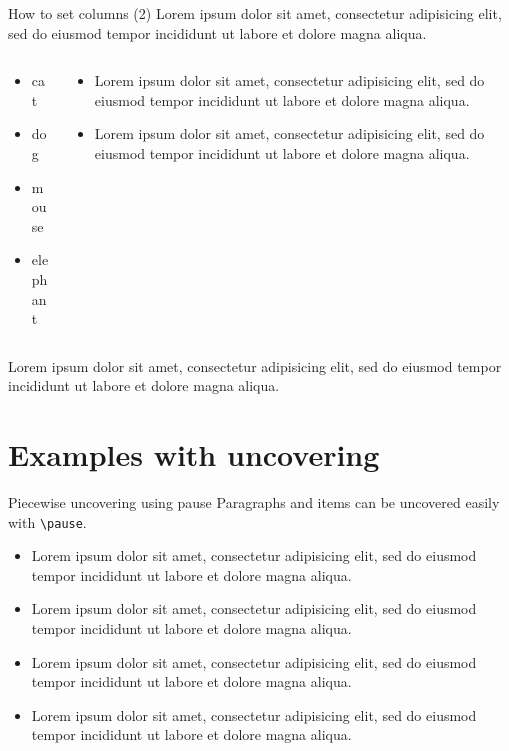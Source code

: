 \documentclass[]{beamer}
\begin{document}
\begin{frame}{How to set columns (2)}
  Lorem ipsum dolor sit amet, consectetur adipisicing elit, sed do eiusmod tempor incididunt ut labore et dolore magna aliqua. 
  \begin{columns}[t]
    \begin{column}{.4\textwidth}
      \begin{itemize}
        \item cat
        \item dog
        \item mouse
        \item elephant
      \end{itemize}
    \end{column}
    \begin{column}{.6\textwidth}
      \begin{itemize}
        \item Lorem ipsum dolor sit amet, consectetur adipisicing elit, sed do eiusmod tempor incididunt ut labore et dolore magna aliqua. 
        \item Lorem ipsum dolor sit amet, consectetur adipisicing elit, sed do eiusmod tempor incididunt ut labore et dolore magna aliqua. 
      \end{itemize}
    \end{column}
  \end{columns}

  Lorem ipsum dolor sit amet, consectetur adipisicing elit, sed do eiusmod tempor incididunt ut labore et dolore magna aliqua. 
\end{frame}

%

\section{Examples with uncovering}

\begin{frame}{Piecewise uncovering using pause}
  Paragraphs and items can be uncovered easily with \texttt{\textbackslash pause}.
  \pause
  \begin{itemize}
    \item Lorem ipsum dolor sit amet, consectetur adipisicing elit, sed do eiusmod tempor incididunt ut labore et dolore magna aliqua. 
      \pause
    \item Lorem ipsum dolor sit amet, consectetur adipisicing elit, sed do eiusmod tempor incididunt ut labore et dolore magna aliqua. 
      \pause
    \item Lorem ipsum dolor sit amet, consectetur adipisicing elit, sed do eiusmod tempor incididunt ut labore et dolore magna aliqua. 
      \pause
    \item Lorem ipsum dolor sit amet, consectetur adipisicing elit, sed do eiusmod tempor incididunt ut labore et dolore magna aliqua. 
  \end{itemize}
\end{frame}
\end{document}
